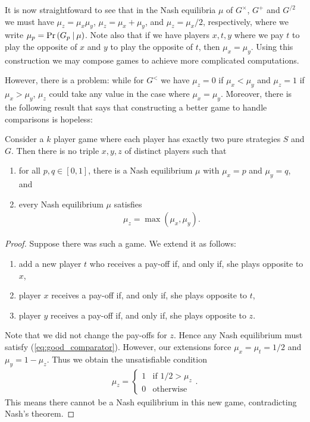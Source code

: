 \documentclass{article}
\begin{document}
It is now straightfoward to see that in the Nash
equilibria $\mu$ of $G^\times$, $G^+$ and $G^{/2}$ we must have $\mu_z =
\mu_x\mu_y$, $\mu_z = \mu_x + \mu_y$, and $\mu_z = \mu_x / 2$, respectively,
where we write $\mu_p = \Pr\left({{G_p}\:|\:\mu}\right)$. Note also that if we have
players $x,t,y$ where we pay $t$ to play the opposite of $x$ and
$y$ to play the opposite of $t$, then $\mu_x=\mu_y$. Using this
construction we may compose games to achieve more complicated
computations.

However, there is a problem: while for $G^<$ we have
$\mu_z = 0$ if $\mu_x<\mu_y$ and $\mu_z = 1$ if $\mu_x>\mu_y$,
$\mu_z$ could take any value in the case where $\mu_x=\mu_y$.
Moreover, there is the following result that says that constructing
a better game to handle comparisons is hopeless:

\begin{lemma}
  Consider a $k$ player game where each player has exactly
  two pure strategies $S$ and $G$. Then there is no triple $x,y,z$ of
  distinct players such that
  \begin{enumerate}
    \item for all $p,q\in[0,1]$, there is a Nash equilibrium
      $\mu$ with $\mu_x = p$ and $\mu_y = q$, and
    \item every Nash equilibrium $\mu$ satisfies
      \begin{align}\label{eq:good_comparator}
        \mu_z = \max(\mu_x,\mu_y).
      \end{align}
  \end{enumerate}
  \begin{proof}
    Suppose there was such a game. We extend it as follows:
    \begin{enumerate}
      \item add a new player $t$ who receives a pay-off if, and only if,
        she plays opposite to $x$,
      \item player $x$ receives a pay-off if, and only if, she plays
        opposite to $t$,
      \item player $y$ receives a pay-off if, and only if, she plays
        opposite to $z$.
    \end{enumerate}
    Note that we did not change the pay-offs for $z$. Hence any
    Nash equilibrium must satisfy (\ref{eq:good_comparator}).
    However, our extensions force $\mu_x = \mu_t = 1/2$
    and $\mu_y = 1-\mu_z$. Thus we obtain the unsatisfiable condition
    \begin{align*}
      \mu_z = \begin{cases}
        1 & \text{if }1/2 > \mu_z \\
        0 & \text{otherwise}
      \end{cases}.
    \end{align*}
    This means there cannot be a Nash equilibrium in this new game,
    contradicting Nash's theorem.
  \end{proof}
\end{lemma}
\end{document}

